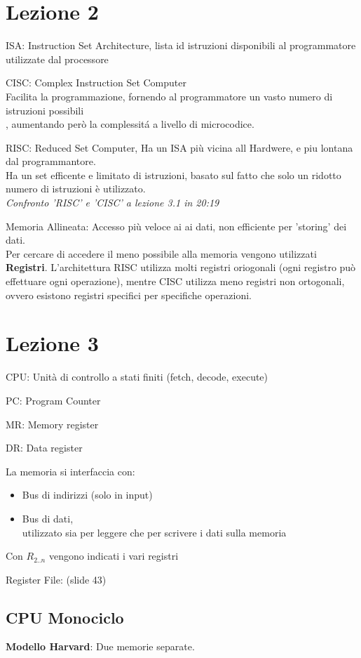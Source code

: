 \documentclass[../ace.tex]{subfiles}
\begin{document}
\section{Lezione 2}
ISA: Instruction Set Architecture, lista id istruzioni disponibili al programmatore utilizzate dal processore

CISC: Complex Instruction Set Computer
\\
Facilita la programmazione, fornendo al programmatore un vasto numero di istruzioni possibili\\
, aumentando però la complessitá a livello di microcodice.


RISC: Reduced Set Computer, Ha un ISA più vicina all Hardwere, e piu lontana dal programmantore.
\\
Ha un set efficente e limitato di istruzioni, basato sul fatto che solo un ridotto numero di istruzioni è utilizzato.
\\
\textit{Confronto 'RISC' e 'CISC' a lezione 3.1 in 20:19}

Memoria Allineata: Accesso più veloce ai ai dati, non efficiente per 'storing' dei dati.
\\
Per cercare di accedere il meno possibile alla memoria vengono utilizzati \textbf{Registri}.
L'architettura RISC utilizza molti registri oriogonali (ogni registro può effettuare ogni operazione),
mentre CISC utilizza meno registri non ortogonali, ovvero esistono registri specifici per specifiche operazioni.
\section{Lezione 3}
CPU: Unità di controllo a stati finiti (fetch, decode, execute)

PC: Program Counter

MR: Memory register

DR: Data register

La memoria si interfaccia con:
\begin{itemize}
    \item Bus di indirizzi (solo in input)
    \item Bus di dati, \\utilizzato sia per leggere che per scrivere i dati sulla memoria
\end{itemize}

Con $R_{2..n}$ vengono indicati i vari registri

Register File: (slide 43)

\subsection{CPU Monociclo}
\textbf{Modello Harvard}: Due memorie separate.%
\end{document}
